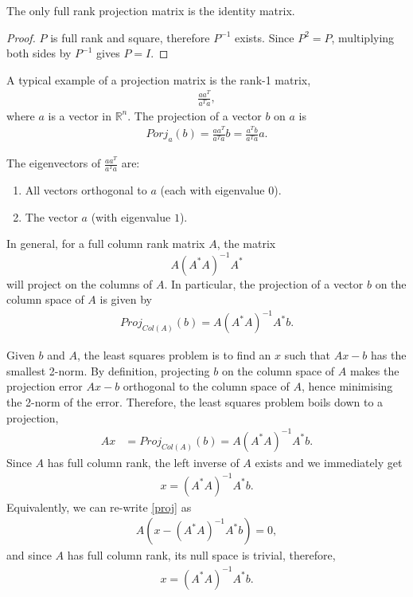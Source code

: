 \documentclass{amsart}
\theoremstyle{plain}
\numberwithin{equation}{section}
\begin{document}
The only full rank projection matrix is the identity matrix. 

\begin{proof}
$P$ is full rank and square, therefore $P^{-1}$ exists. Since $P^2=P$, multiplying both sides by $P^{-1} $ gives
$P=I$. 
\end{proof}
A typical example of a projection matrix is the 
rank-1 matrix,
\begin{align*}
\frac{aa^T}{a^Ta},
\end{align*}
where $a$ is a vector in $\mathbb{R}^n$. The projection of a 
vector $b$ on $a$ is
\begin{align*}
Porj_{a}(b) = \frac{aa^T}{a^Ta} b = \frac{a^Tb}{a^Ta} a.
\end{align*}

The eigenvectors of $\frac{aa^T}{a^Ta}$ are:
\begin{enumerate}
\item All vectors orthogonal to $a$ (each with eigenvalue $0$).
\item The vector $a$ (with eigenvalue $1$).
\end{enumerate}

In general, for a full column rank matrix $A$, the matrix
$$A(A^*A)^{-1}A^*$$ 
will project on the 
columns of $A$. In particular, the 
projection of a vector $b$ on the column space of $A$ is given 
by
\begin{align*}
Proj_{Col(A)}(b) = A(A^*A)^{-1}A^*b.
\end{align*}

Given $b$ and $A$, the least squares problem is to
find an $x$ such that $Ax-b$ has the smallest 2-norm.
By definition, projecting $b$ on the column space of $A$
makes the projection error $Ax-b$ orthogonal to the column 
space of $A$, hence minimising the 2-norm of the 
error. Therefore, the least squares problem boils down to
a projection,
\begin{align}
Ax &= Proj_{Col(A)}(b)= A(A^*A)^{-1}A^*b.
\label{proj}
\end{align}
Since $A$ has full column rank, the left inverse of $A$ exists and 
we immediately get 
\begin{align*}
x = (A^*A)^{-1}A^*b.
\end{align*}
Equivalently, we can re-write \eqref{proj} as 
\begin{align*}
A\left(x - (A^*A)^{-1}A^*b\right) = 0,
\end{align*}
and since $A$ has full column rank, its null space is trivial,
therefore,
\begin{align*}
x = (A^*A)^{-1}A^*b.
\end{align*}
\end{document}
